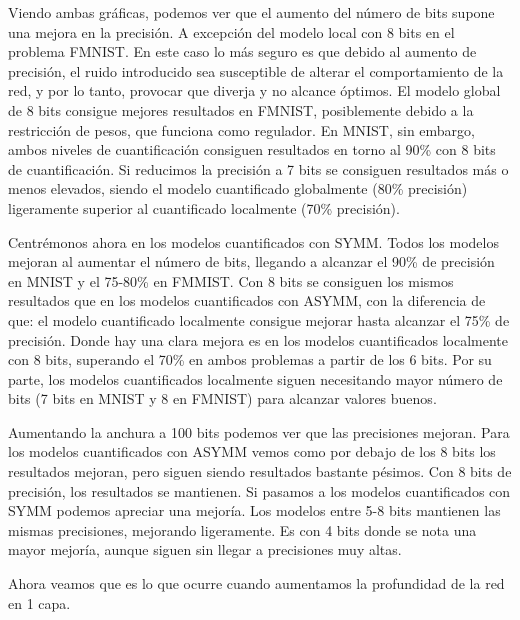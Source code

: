 Viendo ambas gráficas, podemos ver que el aumento del número de bits supone una mejora en la precisión. A excepción del modelo local con 8 bits en el problema FMNIST. En este caso lo más seguro es que debido al aumento de precisión, el ruido introducido sea susceptible de alterar el comportamiento de la red, y por lo tanto, provocar que diverja y no alcance óptimos. El modelo global de 8 bits consigue mejores resultados en FMNIST, posiblemente debido a la restricción de pesos, que funciona como regulador. En MNIST, sin embargo, ambos niveles de cuantificación consiguen resultados en torno al 90\% con 8 bits de cuantificación. Si reducimos la precisión a 7 bits se consiguen resultados más o menos elevados, siendo el modelo cuantificado globalmente (80\% precisión) ligeramente superior al cuantificado localmente (70\% precisión).

Centrémonos ahora en los modelos cuantificados con SYMM. Todos los modelos mejoran al aumentar el número de bits, llegando a alcanzar el 90\% de precisión en MNIST y el 75-80\% en FMMIST. Con 8 bits se consiguen los mismos resultados que en los modelos cuantificados con ASYMM, con la diferencia de que: el modelo cuantificado localmente consigue mejorar hasta alcanzar el 75\% de precisión. Donde hay una clara mejora es en los modelos cuantificados localmente con 8 bits, superando el 70\% en ambos problemas a partir de los 6 bits. Por su parte, los modelos cuantificados localmente siguen necesitando mayor número de bits (7 bits en MNIST y 8 en FMNIST) para alcanzar valores buenos.

Aumentando la anchura a 100 bits podemos ver que las precisiones mejoran. Para los modelos cuantificados con ASYMM vemos como por debajo de los 8 bits los resultados mejoran, pero siguen siendo resultados bastante pésimos. Con 8 bits de precisión, los resultados se mantienen. Si pasamos a los modelos cuantificados con SYMM podemos apreciar una mejoría. Los modelos entre 5-8 bits mantienen las mismas precisiones, mejorando ligeramente. Es con 4 bits donde se nota una mayor mejoría, aunque siguen sin llegar a precisiones muy altas.


Ahora veamos que es lo que ocurre cuando aumentamos la profundidad de la red en 1 capa.

